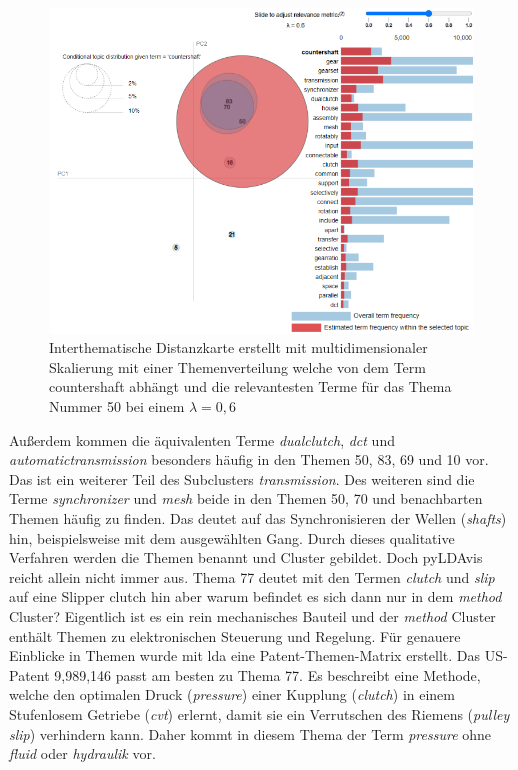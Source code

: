 \begin{landscape}
	\begin{figure}
		\centering
		\includegraphics[width=19.29cm,keepaspectratio=true]{img/clustering_process02.png}
		\caption{
			Interthematische Distanzkarte erstellt mit multidimensionaler Skalierung mit einer Themenverteilung welche von dem Term countershaft abhängt und die relevantesten Terme für das Thema Nummer 50 bei einem $\lambda = 0,6$ 
		}
		\label{fig:clustering_process02}
	\end{figure}
\end{landscape}

 
Außerdem kommen die äquivalenten Terme \emph{dualclutch}, \emph{\gls{dct}} und \emph{automatictransmission} besonders häufig in den Themen 50, 83, 69 und 10 vor. Das ist ein weiterer Teil des Subclusters \emph{transmission}. Des weiteren sind die Terme \emph{synchronizer} und \emph{mesh} beide in den Themen 50, 70 und benachbarten Themen häufig zu finden. Das deutet auf das Synchronisieren der Wellen (\emph{shafts}) hin, beispielsweise mit dem ausgewählten Gang. Durch dieses qualitative Verfahren werden die Themen benannt und Cluster gebildet. Doch \gls{pyLDAvis} reicht allein nicht immer aus. Thema 77 deutet mit den Termen \emph{clutch} und \emph{slip} auf eine Slipper clutch hin aber warum befindet es sich dann nur in dem \emph{method} Cluster? Eigentlich ist es ein rein mechanisches Bauteil und der \emph{method} Cluster enthält Themen zu elektronischen Steuerung und Regelung. Für genauere Einblicke in Themen wurde mit \gls{lda} eine Patent-Themen-Matrix erstellt. Das US-Patent 9,989,146 passt am besten zu Thema 77. Es beschreibt eine Methode, welche den optimalen Druck (\emph{pressure}) einer Kupplung (\emph{clutch}) in einem Stufenlosem Getriebe (\emph{\gls{cvt}}) erlernt, damit sie ein Verrutschen des Riemens (\emph{pulley slip}) verhindern kann. Daher kommt in diesem Thema der Term \emph{pressure} ohne \emph{fluid} oder \emph{hydraulik} vor.
 

